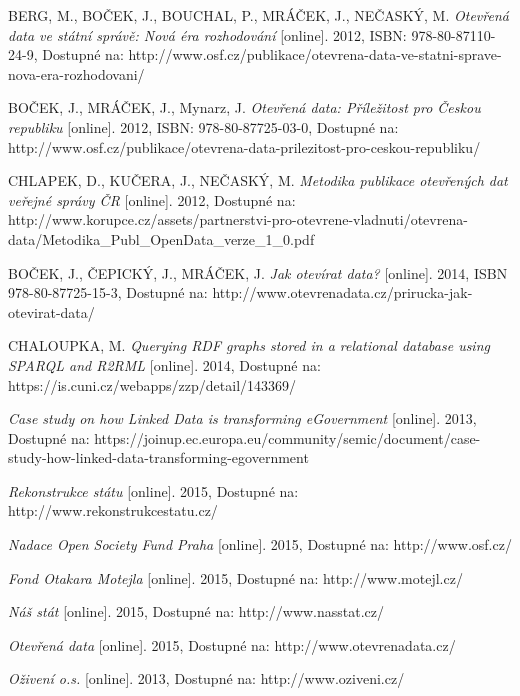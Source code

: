 \begin{thebibliography}{99}
  BERG, M., BOČEK, J., BOUCHAL, P., MRÁČEK, J., NEČASKÝ, M.
  \emph{Otevřená data ve státní správě: Nová éra rozhodování} 
  [online]. 2012, ISBN: 978-80-87110-24-9, Dostupné na: 
  http://www.osf.cz/publikace/otevrena-data-ve-statni-sprave-nova-era-rozhodovani/
 
  BOČEK, J., MRÁČEK, J., Mynarz, J.
  \emph{Otevřená data: Příležitost pro Českou republiku} 
  [online]. 2012, ISBN: 978-80-87725-03-0, Dostupné na: 
  http://www.osf.cz/publikace/otevrena-data-prilezitost-pro-ceskou-republiku/
  
  CHLAPEK, D., KUČERA, J., NEČASKÝ, M.
  \emph{Metodika publikace otevřených dat veřejné správy ČR } 
  [online]. 2012, Dostupné na: 
  http://www.korupce.cz/assets/partnerstvi-pro-otevrene-vladnuti/otevrena-data/Metodika\_Publ\_OpenData\_verze\_1\_0.pdf
  
  BOČEK, J., ČEPICKÝ, J., MRÁČEK, J.
  \emph{Jak otevírat data?} 
  [online]. 2014, ISBN 978-80-87725-15-3, Dostupné na: 
  http://www.otevrenadata.cz/prirucka-jak-otevirat-data/
  
  CHALOUPKA, M.
  \emph{Querying RDF graphs stored in a relational database using SPARQL and R2RML} 
  [online]. 2014, Dostupné na: 
  https://is.cuni.cz/webapps/zzp/detail/143369/

  \emph{Case study on how Linked Data is transforming eGovernment} 
  [online]. 2013, Dostupné na: 
  https://joinup.ec.europa.eu/community/semic/document/case-study-how-linked-data-transforming-egovernment

  \emph{Rekonstrukce státu} 
  [online]. 2015, Dostupné na: 
  http://www.rekonstrukcestatu.cz/ 

  \emph{Nadace Open Society Fund Praha} 
  [online]. 2015, Dostupné na: 
  http://www.osf.cz/  

  \emph{Fond Otakara Motejla} 
  [online]. 2015, Dostupné na: 
  http://www.motejl.cz/
  
  \emph{Náš stát} 
  [online]. 2015, Dostupné na: 
  http://www.nasstat.cz/

  \emph{Otevřená data} 
  [online]. 2015, Dostupné na: 
  http://www.otevrenadata.cz/

  \emph{Oživení o.s.} 
  [online]. 2013, Dostupné na: 
  http://www.oziveni.cz/
  

\end{thebibliography}
